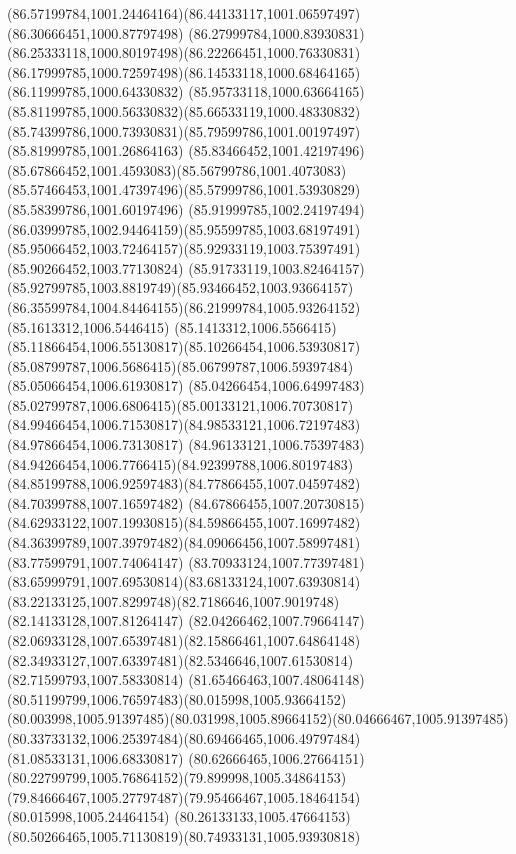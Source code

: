 {{	\curveto(86.57199784,1001.24464164)(86.44133117,1001.06597497)(86.30666451,1000.87797498)
	\curveto(86.27999784,1000.83930831)(86.25333118,1000.80197498)(86.22266451,1000.76330831)
	\curveto(86.17999785,1000.72597498)(86.14533118,1000.68464165)(86.11999785,1000.64330832)
	\curveto(85.95733118,1000.63664165)(85.81199785,1000.56330832)(85.66533119,1000.48330832)
	\curveto(85.74399786,1000.73930831)(85.79599786,1001.00197497)(85.81999785,1001.26864163)
	\curveto(85.83466452,1001.42197496)(85.67866452,1001.4593083)(85.56799786,1001.4073083)
	\curveto(85.57466453,1001.47397496)(85.57999786,1001.53930829)(85.58399786,1001.60197496)
	\curveto(85.91999785,1002.24197494)(86.03999785,1002.94464159)(85.95599785,1003.68197491)
	\curveto(85.95066452,1003.72464157)(85.92933119,1003.75397491)(85.90266452,1003.77130824)
	\curveto(85.91733119,1003.82464157)(85.92799785,1003.8819749)(85.93466452,1003.93664157)
	\curveto(86.35599784,1004.84464155)(86.21999784,1005.93264152)(85.1613312,1006.5446415)
	\curveto(85.1413312,1006.5566415)(85.11866454,1006.55130817)(85.10266454,1006.53930817)
	\curveto(85.08799787,1006.5686415)(85.06799787,1006.59397484)(85.05066454,1006.61930817)
	\curveto(85.04266454,1006.64997483)(85.02799787,1006.6806415)(85.00133121,1006.70730817)
	\curveto(84.99466454,1006.71530817)(84.98533121,1006.72197483)(84.97866454,1006.73130817)
	\curveto(84.96133121,1006.75397483)(84.94266454,1006.7766415)(84.92399788,1006.80197483)
	\curveto(84.85199788,1006.92597483)(84.77866455,1007.04597482)(84.70399788,1007.16597482)
	\curveto(84.67866455,1007.20730815)(84.62933122,1007.19930815)(84.59866455,1007.16997482)
	\curveto(84.36399789,1007.39797482)(84.09066456,1007.58997481)(83.77599791,1007.74064147)
	\curveto(83.70933124,1007.77397481)(83.65999791,1007.69530814)(83.68133124,1007.63930814)
	\curveto(83.22133125,1007.8299748)(82.7186646,1007.9019748)(82.14133128,1007.81264147)
	\curveto(82.04266462,1007.79664147)(82.06933128,1007.65397481)(82.15866461,1007.64864148)
	\curveto(82.34933127,1007.63397481)(82.5346646,1007.61530814)(82.71599793,1007.58330814)
	\curveto(81.65466463,1007.48064148)(80.51199799,1006.76597483)(80.015998,1005.93664152)
	\curveto(80.003998,1005.91397485)(80.031998,1005.89664152)(80.04666467,1005.91397485)
	\curveto(80.33733132,1006.25397484)(80.69466465,1006.49797484)(81.08533131,1006.68330817)
	\curveto(80.62666465,1006.27664151)(80.22799799,1005.76864152)(79.899998,1005.34864153)
	\curveto(79.84666467,1005.27797487)(79.95466467,1005.18464154)(80.015998,1005.24464154)
	\curveto(80.26133133,1005.47664153)(80.50266465,1005.71130819)(80.74933131,1005.93930818)
}}
